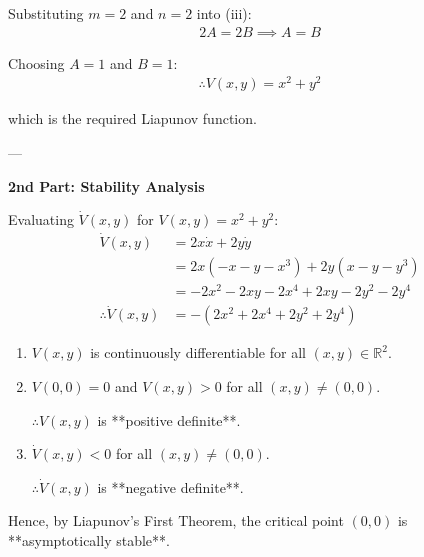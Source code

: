 Substituting $m = 2$ and $n = 2$ into (iii):
\begin{align*}
    2A = 2B \implies A = B
\end{align*}

Choosing $A = 1$ and $B = 1$:
\begin{align*}
    \therefore V(x, y) = x^2 + y^2
\end{align*}

which is the required Liapunov function.

---
\begin{minipage}{0.5 \textwidth}
    \textbf{2nd Part: Stability Analysis}

Evaluating $\dot{V}(x, y)$ for $V(x, y) = x^2 + y^2$:
\begin{align*}
    \dot{V}(x, y) &= 2x \dot{x} + 2y \dot{y} \\
    &= 2x(-x - y - x^3) + 2y(x - y - y^3) \\
    &= -2x^2 - 2xy - 2x^4 + 2xy - 2y^2 - 2y^4 \\
    \therefore \dot{V}(x, y) &= -\left(2x^2 + 2x^4 + 2y^2 + 2y^4\right)
\end{align*}
\end{minipage}
\hfill
\begin{minipage}{0.45 \textwidth}
    \begin{enumerate}
    \item $V(x, y)$ is continuously differentiable for all $(x, y) \in \mathbb{R}^2$.
    \item $V(0,0) = 0$ and $V(x, y) > 0$ for all $(x, y) \neq (0,0)$. 
    
    $\therefore V(x, y)$ is **positive definite**.
    
    \item $\dot{V}(x, y) < 0$ for all $(x, y) \neq (0,0)$.
    
    $\therefore \dot{V}(x, y)$ is **negative definite**.
\end{enumerate}
\end{minipage}
Hence, by Liapunov's First Theorem, the critical point $(0, 0)$ is **asymptotically stable**.